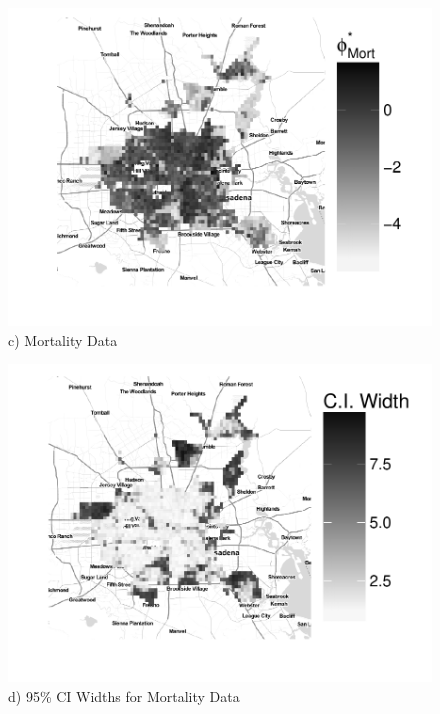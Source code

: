 \documentclass[final]{statsoc}
\begin{document}
\begin{figure}
  \begin{minipage}[t]{0.49\textwidth}
    \centering
    \includegraphics[width=1.0\textwidth]{./imgs/relative_risk_death.pdf}
    c) Mortality Data
    \\
  \end{minipage}
  \hfill
    \begin{minipage}[t]{0.49\textwidth}
    \centering
    \includegraphics[width=1.0\textwidth]{imgs/ci_width_death.pdf}
    \\
    d) 95\% CI Widths for Mortality Data
    \\
  \end{minipage}
  \begin{minipage}[t]{0.49\textwidth}

\end{minipage}
\end{figure}
\end{document}
